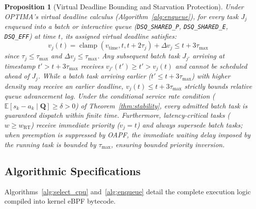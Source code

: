 \documentclass[letterpaper,twocolumn,10pt]{article}
\newtheorem{proposition}{Proposition}
\begin{document}
\begin{proposition}[Virtual Deadline Bounding and Starvation Protection]
\label{prop:starvation}
Under OPTIMA's virtual deadline calculus (Algorithm~\ref{alg:enqueue}), for every task $J_j$ enqueued into a batch or interactive queue (\texttt{DSQ\_SHARED\_P}, \texttt{DSQ\_SHARED\_E}, \texttt{DSQ\_EFF}) at time $t$, its assigned virtual deadline satisfies:
\begin{equation}
v_j(t) = \operatorname{clamp}(v_{\mathrm{time}}, t, t + 2\tau_j) + \Delta v_j \le t + 3\tau_{\max}
\end{equation}
since $\tau_j \le \tau_{\max}$ and $\Delta v_j \le \tau_{\max}$. Any subsequent batch task $J_{j'}$ arriving at timestamp $t' > t + 3\tau_{\max}$ receives $v_{j'}(t') \ge t' > v_j(t)$ and cannot be scheduled ahead of $J_j$. While a batch task arriving earlier ($t' \le t + 3\tau_{\max}$) with higher density may receive an earlier deadline, $v_j(t) \le t + 3\tau_{\max}$ strictly bounds relative queue advancement lag. Under the conditional service rate condition ($\mathbb{E}[s_k - a_k \mid \mathbf{Q}] \ge \delta > 0$) of Theorem~\ref{thm:stability}, every admitted batch task is guaranteed dispatch within finite time. Furthermore, latency-critical tasks ($w \ge w_{\mathrm{RT}}$) receive immediate priority ($v_j = t$) and always supersede batch tasks; when preemption is suppressed by OAPF, the immediate waiting delay imposed by the running task is bounded by $\tau_{\max}$, ensuring bounded priority inversion.
\end{proposition}

\subsection{Algorithmic Specifications}
Algorithms~\ref{alg:select_cpu} and~\ref{alg:enqueue} detail the complete execution logic compiled into kernel eBPF bytecode.
\end{document}
